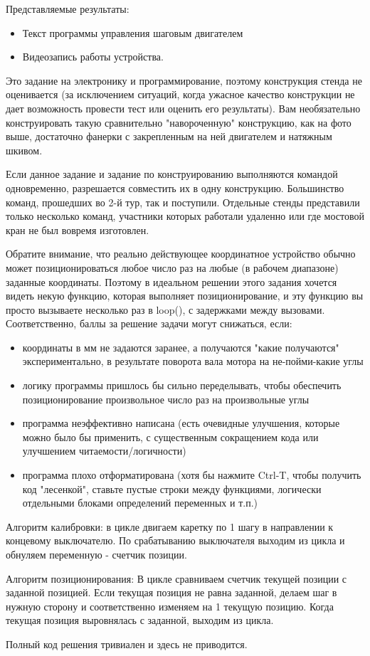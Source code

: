 Представляемые результаты:

\begin{itemize}
    \item Текст программы управления шаговым двигателем
    \item Видеозапись работы устройства.
\end{itemize}

\solutionSection

Это задание на электронику и программирование, поэтому конструкция стенда не оценивается (за исключением ситуаций, когда ужасное качество конструкции не дает возможность провести тест или оценить его результаты). Вам необязательно конструировать такую сравнительно "навороченную" конструкцию, как на фото выше,  достаточно фанерки с закрепленным на ней двигателем и натяжным шкивом. 

Если данное задание и задание по конструированию выполняются командой одновременно, разрешается совместить их в одну конструкцию. Большинство команд, прошедших во 2-й тур, так и поступили.  Отдельные стенды представили только несколько команд, участники которых работали удаленно или где мостовой кран не был вовремя изготовлен.

Обратите внимание,  что реально действующее координатное устройство обычно может позиционироваться любое число раз на любые (в рабочем диапазоне) заданные координаты.  Поэтому в идеальном решении этого задания хочется видеть некую функцию, которая выполняет позиционирование, и эту функцию вы просто вызываете несколько раз в loop(), с задержками между вызовами.  Соответственно, баллы за решение задачи могут снижаться, если:
\begin{itemize}
    \item координаты в мм не задаются заранее, а получаются "какие получаются" экспериментально, в результате поворота вала мотора на не-пойми-какие  углы
    \item логику программы пришлось бы сильно переделывать,  чтобы обеспечить позиционирование произвольное число раз на произвольные углы
    \item программа неэффективно написана  (есть очевидные улучшения, которые можно было бы применить, с существенным сокращением кода или улучшением читаемости/логичности)
    \item программа плохо отформатирована (хотя бы нажмите Ctrl-T, чтобы получить код "лесенкой", ставьте пустые строки между функциями, логически отдельными блоками определений переменных и т.п.)
\end{itemize}

Алгоритм калибровки:  в цикле двигаем каретку по 1 шагу в направлении к концевому выключателю.  По срабатыванию выключателя выходим из цикла и обнуляем переменную - счетчик позиции.

Алгоритм позиционирования:  В цикле сравниваем счетчик текущей позиции с заданной позицией. Если текущая позиция не равна заданной, делаем шаг в нужную сторону и соответственно изменяем на 1 текущую позицию. Когда текущая позиция выровнялась с заданной, выходим из цикла.

Полный код решения тривиален и здесь не приводится.